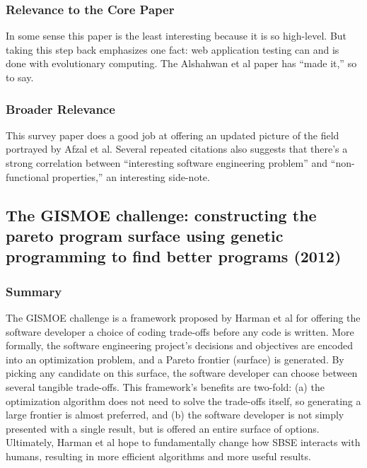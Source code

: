 \documentclass{sig-alternate-05-2015}
\begin{document}
\subsubsection{Relevance to the Core Paper}
In some sense this paper is the least interesting because it is so high-level. But taking this step back emphasizes one fact: web application testing can and is done with evolutionary computing. The Alshahwan et al paper has ``made it,'' so to say.

\subsubsection{Broader Relevance}
This survey paper does a good job at offering an updated picture of the field portrayed by Afzal et al. Several repeated citations also suggests that there's a strong correlation between ``interesting software engineering problem'' and ``non-functional properties,'' an interesting side-note.  


\subsection{The GISMOE challenge: constructing the pareto program surface using genetic programming to find better programs (2012)}

\subsubsection{Summary}
The GISMOE challenge is a framework proposed by Harman et al \cite{harman2012gismoe} for offering the software developer a choice of coding trade-offs before any code is written. More formally, the software engineering project's decisions and objectives are encoded into an optimization problem, and a Pareto frontier (surface) is generated. By picking any candidate on this surface, the software developer can choose between several tangible trade-offs. This framework's benefits are two-fold: (a) the optimization algorithm does not need to solve the trade-offs itself, so generating a large frontier is almost preferred, and (b) the software developer is not simply presented with a single result, but is offered an entire surface of options. Ultimately, Harman et al hope to fundamentally change how SBSE interacts with humans, resulting in more efficient algorithms and more useful results. 
\end{document}
